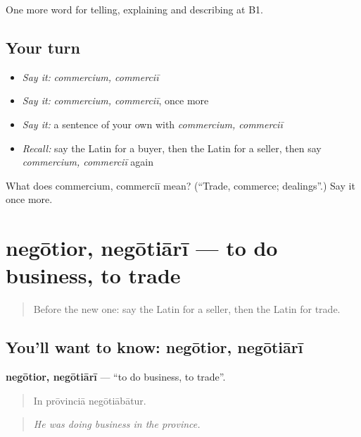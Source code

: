 \begin{grammarlens}[title={What you've built}]
One more word for telling, explaining and describing at B1.
\end{grammarlens}

\subsection*{Your turn}
\begin{itemize}
\raggedright
  \item \emph{Say it:} \emph{commercium, commerciī}
  \item \emph{Say it:} \emph{commercium, commerciī}, once more
  \item \emph{Say it:} a sentence of your own with \emph{commercium, commerciī}
  \item \emph{Recall:} say the Latin for a buyer, then the Latin for a seller, then say \emph{commercium, commerciī} again
\end{itemize}

\begin{tcolorbox}[breakable,colback=teal!4,colframe=teal!35!black,title={Before you move on}]
What does commercium, commerciī mean? (\textquotedblleft{}Trade, commerce; dealings\textquotedblright{}.) Say it once more.
\end{tcolorbox}
\section[negōtior, negōtiārī]{negōtior, negōtiārī — to do business, to trade}

\label{lesson:LA-C421-negotior}



\begin{quote}
Before the new one: say the Latin for a seller, then the Latin for trade.
\end{quote}

\subsection*{You'll want to know: negōtior, negōtiārī}
\textbf{negōtior, negōtiārī} — \textquotedblleft{}to do business, to trade\textquotedblright{}.

\begin{quote}
In prōvinciā negōtiābātur.
\end{quote}

\begin{quote}
\emph{He was doing business in the province.}
\end{quote}

